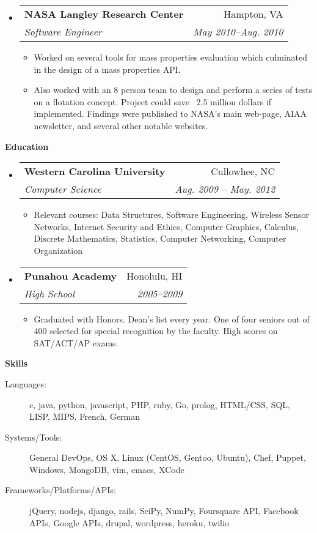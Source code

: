 \documentclass[letterpaper,11pt]{article}
\makeatletter
\newcommand{\resitem}[1]{\item #1 \vspace{-2pt}}
\newcommand{\resheading}[1]{{\large \colorbox{mygrey}{\begin{minipage}{\textwidth}{\textbf{#1 \vphantom{p\^{E}}}}\end{minipage}}}}
\newcommand{\ressubheading}[4]{
\begin{tabular*}{7.0in}{l@{\extracolsep{\fill}}r}
		\textbf{#1} & #2 \\
		\textit{#3} & \textit{#4} \\
\end{tabular*}\vspace{-6pt}}
\makeatother
\begin{document}
\begin{itemize}
\begin{itemize}
   \end{itemize}
\item
   \ressubheading{NASA Langley Research Center}{Hampton, VA}{Software Engineer}{May 2010--Aug. 2010}
      \begin{itemize}
         \resitem{Worked on several tools for mass properties evaluation which culminated in the design of a mass properties API.} 
         \resitem{Also worked with an 8 person team to design and perform a series of tests on a flotation concept. Project could save ~2.5 million dollars if implemented. Findings were published to NASA's main web-page, AIAA newsletter, and several other notable websites.}
      \end{itemize}
\end{itemize}
\resheading{Education}
\begin{itemize}
\item
   \ressubheading{Western Carolina University}{Cullowhee, NC}{Computer Science}{Aug. 2009 -- May. 2012}
   \begin{itemize}
      \resitem{Relevant courses: Data Structures, Software Engineering, Wireless Sensor Networks, Internet Security and Ethics, Computer Graphics, Calculus, Discrete Mathematics, Statistics, Computer Networking, Computer Organization}
   \end{itemize}
\item
   \ressubheading{Punahou Academy}{Honolulu, HI}{High School}{2005--2009}
   \begin{itemize}
      \resitem{Graduated with Honors. Dean's list every year. One of four seniors out of 400 selected for special recognition by the faculty. High scores on SAT/ACT/AP exams.}
   \end{itemize}
\end{itemize}
\pagebreak
\resheading{Skills}
\begin{description}
\item[Languages:]
c, java, python, javascript, PHP, ruby, Go, prolog, HTML/CSS, SQL, LISP, MIPS, French, German
\item[Systems/Tools:]
General DevOps, OS X, Linux (CentOS, Gentoo, Ubuntu), Chef, Puppet, Windows, MongoDB, vim, emacs, XCode
\item[Frameworks/Platforms/APIs:]
jQuery, nodejs, django, rails, SciPy, NumPy, Foursquare API, Facebook APIs, Google APIs, drupal, wordpress, heroku, twilio
\end{description}
\end{document}
